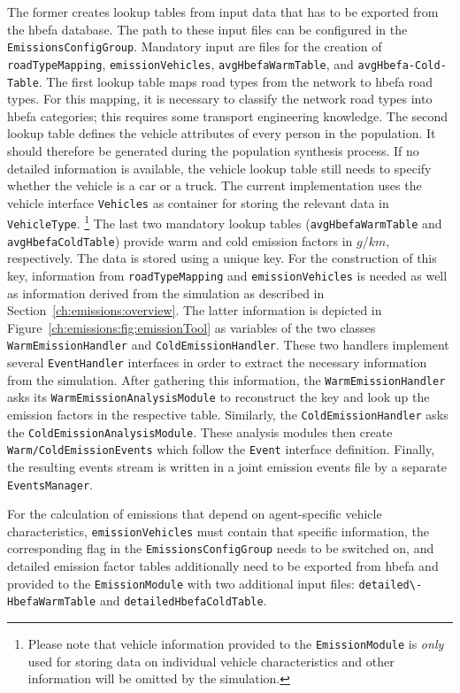 The former creates lookup tables from input data that has to be exported from the \gls{hbefa} database. The path to these input files can be configured in the \lstinline|EmissionsConfigGroup|. Mandatory input are files for the creation of \lstinline|roadTypeMapping|, \lstinline|emissionVehicles|, \lstinline|avgHbefaWarmTable|, and \lstinline|avgHbefa-Cold-Table|.
%
The first lookup table maps road types from the  network to \gls{hbefa} road types. For this mapping, it is necessary to classify the network road types into \gls{hbefa} categories; this requires some transport engineering knowledge.
%
The second lookup table defines the vehicle attributes of every person in the population. It should therefore be generated during the population synthesis process. If no detailed information is available, the vehicle lookup table still needs to specify whether the vehicle is a car or a truck. The current implementation uses the  vehicle interface 
\lstinline|Vehicles| as container for storing the relevant data in \lstinline|VehicleType|.%
%
\footnote{
%
Please note that vehicle information provided to the \lstinline|EmissionModule| is \emph{only} used for storing data on individual vehicle characteristics and other information will be omitted by the simulation.
%
}
%
The last two mandatory lookup tables (\lstinline|avgHbefaWarmTable| and \lstinline|avgHbefaColdTable|) provide warm and cold emission factors in $g/km$, respectively. The data is stored using a unique key. For the construction of this key, information from \lstinline|roadTypeMapping| and \lstinline|emissionVehicles| is needed as well as information derived from the simulation as described in Section~\ref{ch:emissions:overview}.
%
The latter information is depicted in Figure~\ref{ch:emissions:fig:emissionTool} as variables of the two classes \lstinline|WarmEmissionHandler| and \lstinline|ColdEmissionHandler|. These two handlers implement several  \lstinline|EventHandler| interfaces in order to extract the necessary information from the simulation. After gathering this information, the \lstinline|WarmEmissionHandler| asks its \lstinline|WarmEmissionAnalysisModule| to reconstruct the key and look up the emission factors in the respective table. Similarly, the \lstinline|ColdEmissionHandler| asks the \lstinline|ColdEmissionAnalysisModule|. These analysis modules then create \lstinline|Warm/ColdEmissionEvents| which follow the  \lstinline|Event| interface definition. Finally, the resulting events stream is written in a joint emission events file by a separate \lstinline|EventsManager|.

For the calculation of emissions that depend on agent-specific vehicle characteristics, \lstinline|emissionVehicles| must contain that specific information, the corresponding flag in the \lstinline|EmissionsConfigGroup| needs to be switched on, and detailed emission factor tables additionally need to be exported from \gls{hbefa} and provided to the \lstinline|EmissionModule| with two additional input files: \lstinline|detailed\-HbefaWarmTable| and \lstinline|detailedHbefaColdTable|.

